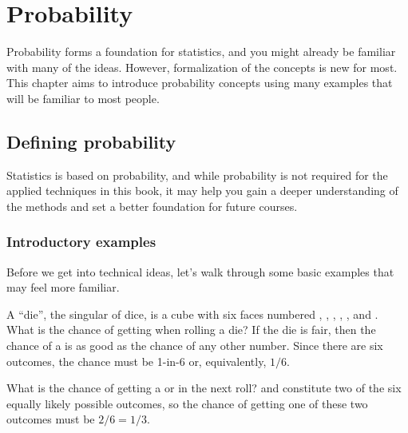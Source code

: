 \chapter{Probability}
\label{probability}
\label{ch_probability}
\renewcommand{\chapterfolder}{ch_probability}



Probability forms a foundation for statistics,
and you might already be familiar with many of the ideas.
However, formalization of the concepts is new for most.
This chapter aims to introduce probability concepts using
many examples that will be familiar to most people.




\section{Defining probability}
\label{basicsOfProbability}

Statistics is based on probability,
and while probability is not required for the applied
techniques in this book, it may help you gain a deeper
understanding of the methods and set a better foundation
for future courses.


\subsection{Introductory examples}

Before we get into technical ideas, let's walk through
some basic examples that may feel more familiar.

\begin{examplewrap}
\begin{nexample}{A ``die'', the singular of dice, is a cube with six faces numbered , , , , , and . What is the chance of getting  when rolling a die?}\label{probOf1}
If the die is fair, then the chance of a  is as good as the chance of any other number. Since there are six outcomes, the chance must be 1-in-6 or, equivalently, $1/6$.
\end{nexample}
\end{examplewrap}

\begin{examplewrap}
\begin{nexample}{What is the chance of getting a  or  in the next roll?}\label{probOf1Or2}
 and  constitute two of the six equally likely possible outcomes, so the chance of getting one of these two outcomes must be $2/6 = 1/3$.
\end{nexample}
\end{examplewrap}

